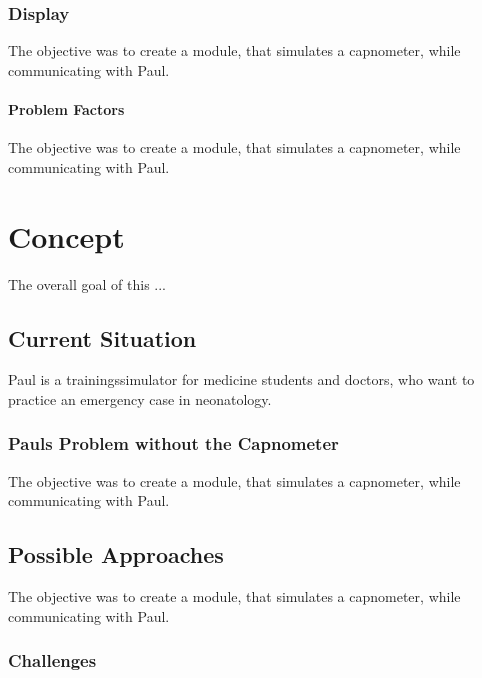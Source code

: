 \documentclass[12pt]{article}
\begin{document}
\subsubsection{Display}

The objective was to create a module, that simulates a capnometer, while communicating
with Paul.


\paragraph{Problem Factors}

The objective was to create a module, that simulates a capnometer, while communicating
with Paul.


\clearpage



\section{Concept}

The overall goal of this ...


\subsection{Current Situation}

Paul is a trainingssimulator for medicine students and doctors, who want to practice
an emergency case in neonatology.


\subsubsection{Pauls Problem without the Capnometer}

The objective was to create a module, that simulates a capnometer, while communicating
with Paul.


\subsection{Possible Approaches}

The objective was to create a module, that simulates a capnometer, while communicating
with Paul.


\subsubsection{Challenges}
\end{document}
